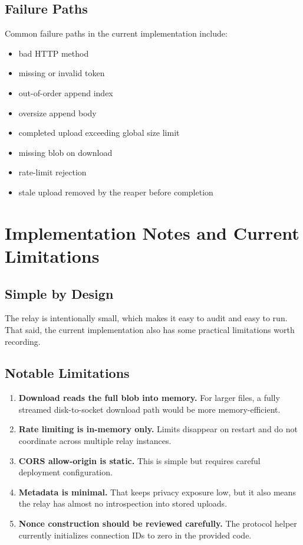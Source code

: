 \documentclass[11pt,a4paper]{report}
\begin{document}
\section{Failure Paths}

Common failure paths in the current implementation include:

\begin{itemize}[leftmargin=1.5cm]
    \item bad HTTP method
    \item missing or invalid token
    \item out-of-order append index
    \item oversize append body
    \item completed upload exceeding global size limit
    \item missing blob on download
    \item rate-limit rejection
    \item stale upload removed by the reaper before completion
\end{itemize}

\chapter{Implementation Notes and Current Limitations}

\section{Simple by Design}

The relay is intentionally small, which makes it easy to audit and easy to run. That said, the current implementation also has some practical limitations worth recording.

\section{Notable Limitations}

\begin{enumerate}
    \item \textbf{Download reads the full blob into memory.} For larger files, a fully streamed disk-to-socket download path would be more memory-efficient.
    \item \textbf{Rate limiting is in-memory only.} Limits disappear on restart and do not coordinate across multiple relay instances.
    \item \textbf{CORS allow-origin is static.} This is simple but requires careful deployment configuration.
    \item \textbf{Metadata is minimal.} That keeps privacy exposure low, but it also means the relay has almost no introspection into stored uploads.
    \item \textbf{Nonce construction should be reviewed carefully.} The protocol helper currently initializes connection IDs to zero in the provided code.
\end{enumerate}
\end{document}

